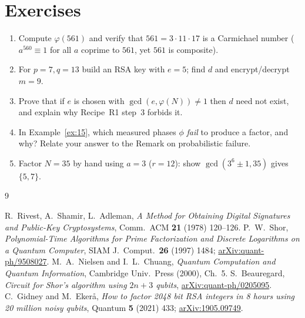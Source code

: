 \documentclass[11pt]{article}
\theoremstyle{plain}
\theoremstyle{definition}
\theoremstyle{remark}
\begin{document}
\section*{Exercises}
\begin{enumerate}[leftmargin=2em,itemsep=2pt]
  \item Compute $\varphi(561)$ and verify that $561=3\cdot 11\cdot 17$ is a Carmichael
        number ($a^{560}\equiv1$ for all $a$ coprime to $561$, yet $561$ is composite).
  \item For $p=7,q=13$ build an RSA key with $e=5$; find $d$ and encrypt/decrypt $m=9$.
  \item Prove that if $e$ is chosen with $\gcd(e,\varphi(N))\neq 1$ then $d$ need not exist,
        and explain why Recipe~R1 step~3 forbids it.
  \item In Example~\ref{ex:15}, which measured phases $\phi$ \emph{fail} to produce a factor,
        and why? Relate your answer to the Remark on probabilistic failure.
  \item Factor $N=35$ by hand using $a=3$ ($r=12$): show $\gcd(3^{6}\pm1,35)$ gives
        $\{5,7\}$.
\end{enumerate}

\begin{thebibliography}{9}
 R.~Rivest, A.~Shamir, L.~Adleman,
  \emph{A Method for Obtaining Digital Signatures and Public-Key Cryptosystems},
  Comm.\ ACM \textbf{21} (1978) 120--126.
 P.~W.~Shor,
  \emph{Polynomial-Time Algorithms for Prime Factorization and Discrete Logarithms on a
  Quantum Computer}, SIAM J.\ Comput.\ \textbf{26} (1997) 1484;
  \href{https://arxiv.org/abs/quant-ph/9508027}{arXiv:quant-ph/9508027}.
 M.~A.~Nielsen and I.~L.~Chuang,
  \emph{Quantum Computation and Quantum Information}, Cambridge Univ.\ Press (2000), Ch.~5.
 S.~Beauregard,
  \emph{Circuit for Shor's algorithm using $2n+3$ qubits},
  \href{https://arxiv.org/abs/quant-ph/0205095}{arXiv:quant-ph/0205095}.
 C.~Gidney and M.~Eker\aa,
  \emph{How to factor 2048 bit RSA integers in 8 hours using 20 million noisy qubits},
  Quantum \textbf{5} (2021) 433; \href{https://arxiv.org/abs/1905.09749}{arXiv:1905.09749}.
\end{thebibliography}
\end{document}
